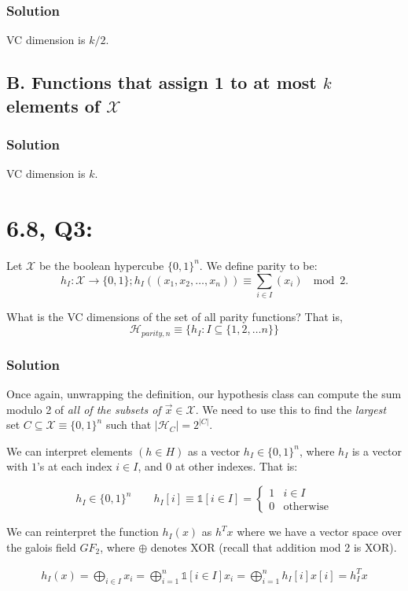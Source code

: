 \documentclass[11pt]{article}
\renewcommand{\H}{\ensuremath{\mathcal{H}}}
\newcommand{\X}{\ensuremath{\mathcal{X}}}
\begin{document}
\subsubsection*{Solution}
VC dimension is $k/2$. 

\subsection*{B. Functions that assign 1 to at most $k$ elements of \X}


\subsubsection*{Solution}
VC dimension is $k$.


\section*{6.8, Q3:}
Let $\X$ be the boolean hypercube $\{0, 1\}^n$. We define parity to be:
$$h_I: \X \rightarrow \{0, 1\}; h_I((x_1, x_2, \dots, x_n)) \equiv \sum_{i \in I} (x_i) ~ \mod 2.$$

What is the VC dimensions of the set of all parity functions? That is,
$$\H_{parity, n} \equiv \{ h_I : I \subseteq \{1, 2, \dots n\} \}$$

\subsubsection*{Solution}

Once again, unwrapping the definition, our hypothesis class can compute the
sum modulo 2 of \emph{all of the subsets of $\vec x \in \X$}. We need to
use this to find the \emph{largest} set $C \subseteq \X \equiv \{0, 1\}^n$ such
that $|\H_C| = 2^{|C|}$. 

We can interpret elements $(h \in H)$ as a vector 
$h_I \in \{0, 1\}^n$, where $h_I$ is a vector with $1$'s at each index $i \in I$,
and $0$ at other indexes. That is:

$$
h_I \in \{0, 1\}^n \qquad
h_I[i] \equiv \mathbb{1}[i \in I] = 
\begin{cases} 1 & i \in I \\ 0 & \text{otherwise} \end{cases}
$$


We can reinterpret the function $h_I(x)$ as $h^T x$ where we have
a vector space over the galois field $GF_2$, where $\oplus$ denotes XOR (recall
that addition mod 2 is XOR).

\begin{align*}
h_I(x) = \bigoplus_{i \in I} x_i = \bigoplus_{i=1}^n \mathbb{1}[i \in I] x_i = \bigoplus_{i=1}^n h_I[i] x[i] =  h_I^T x
\end{align*}
\end{document}
